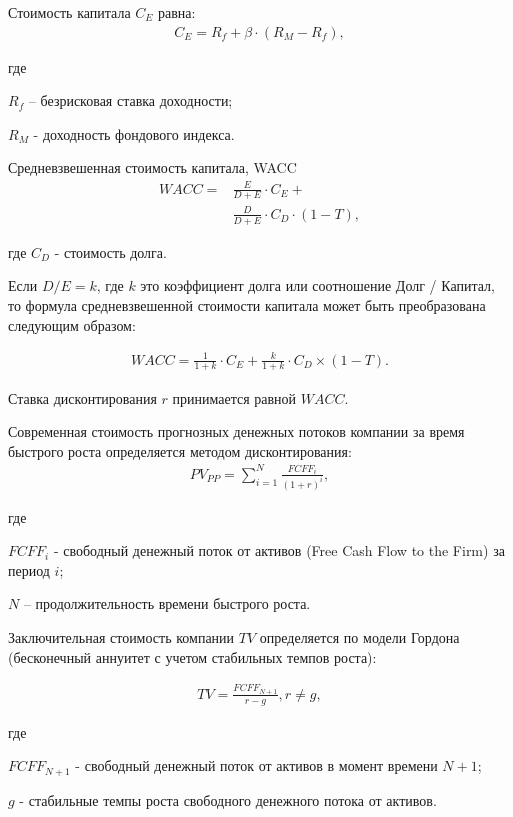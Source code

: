 \documentclass[_Venture_p2.tex]{subfiles}
\begin{document}
\begin{frame}{}
Стоимость капитала $C_E$ равна:
\begin{align}
C_E=R_f+ \beta \cdot (R_M-R_f), 
\end{align}

где 

$R_f$ – безрисковая ставка доходности;

$R_M$ - доходность фондового индекса.
\end{frame}

\begin{frame}[allowframebreaks]{Средневзвешенная стоимость капитала, WACC}
\begin{align}\label{eq:wacc}
WACC=&\frac{E}{D+E} \cdot C_E + \\\nonumber
	&\frac{D}{D+E} \cdot C_D \cdot (1-T), 
\end{align}

где
$C_D$ - стоимость долга.

\pagebreak

Если $D/E=k$, где $k$ это коэффициент долга или соотношение Долг / Капитал, то формула средневзвешенной стоимости капитала может быть преобразована следующим образом:

\begin{align}\label{eq:wacc_k}
WACC=\frac{1}{1+k} \cdot C_E + \frac{k}{1+k} \cdot C_D×(1-T).
\end{align}

Ставка дисконтирования $r$ принимается равной $WACC$.

\end{frame}

\begin{frame}
Современная стоимость прогнозных денежных потоков компании за время быстрого роста определяется методом дисконтирования:
\begin{align}\label{eq:pvpp}
PV_{PP}=\sum_{i=1}^{N} \frac{FCFF_i}{(1+r)^i}, 
\end{align}

где 

$FCFF_i$ - свободный денежный поток от активов (Free Cash Flow to the Firm) за период $i$;

$N$ – продолжительность времени быстрого роста.

\end{frame}

\begin{frame}
Заключительная стоимость компании $TV$ определяется по модели Гордона (бесконечный аннуитет с учетом стабильных темпов роста):

\begin{align}\label{eq:gordon}
TV=\frac{FCFF_{N+1}}{r-g}, r\neq g,
\end{align}

где 

$FCFF_{N+1}$ -  свободный денежный поток от активов в момент времени $N+1$;

$g$ - стабильные темпы роста свободного денежного потока от активов.
\end{frame}
\end{document}
